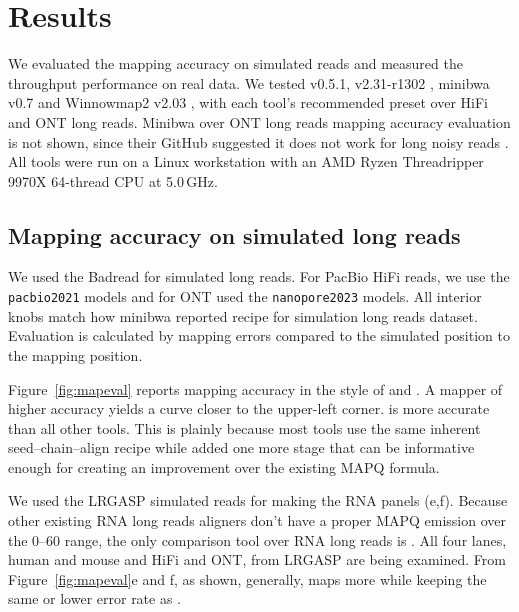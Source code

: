 
\section{Results}


We evaluated the mapping accuracy on simulated reads and measured the throughput performance on real data. We tested \flash{} v0.5.1, \mmtwo{} v2.31-r1302 \citep{li2018minimap2}, minibwa v0.7 \citep{li2026minibwa} and Winnowmap2 v2.03 \citep{jain2020winnowmap,jain2022winnowmap2}, with each tool's recommended preset over HiFi and ONT long reads. Minibwa over ONT long reads mapping accuracy evaluation is not shown, since their GitHub suggested it does not work for long noisy reads \citep{minibwa2026github}. All tools were run on a Linux workstation with an AMD Ryzen Threadripper 9970X 64-thread CPU at 5.0\,GHz.

\subsection{Mapping accuracy on simulated long reads}
\label{sec:res-dna}


We used the Badread \citep{wick2019badread} for simulated long reads. For PacBio HiFi reads, we use the \texttt{pacbio2021} models and for ONT used the \texttt{nanopore2023} models. All interior knobs match how minibwa \citep{li2026minibwa} reported recipe for simulation long reads dataset. Evaluation is calculated by mapping errors compared to the simulated position to the mapping position.

Figure~\ref{fig:mapeval} reports mapping accuracy in the style of \citet{li2026minibwa} and \citet{li2018minimap2}. A mapper of higher accuracy yields a curve closer to the upper-left corner. \flash{} is more accurate than all other tools. This is plainly because most tools use the same inherent seed--chain--align recipe while \flash{} added one more stage that can be informative enough for creating an improvement over the existing MAPQ formula.



We used the LRGASP simulated reads \citep{pardopalacios2024lrgasp} for making the RNA panels (e,f). Because other existing RNA long reads aligners don't have a proper MAPQ emission over the 0--60 range, the only comparison tool over RNA long reads is \mmtwo{}. All four lanes, human and mouse and HiFi and ONT, from LRGASP are being examined. From Figure~\ref{fig:mapeval}e and f, as shown, generally, \flash{} maps more while keeping the same or lower error rate as \mmtwo{}.



